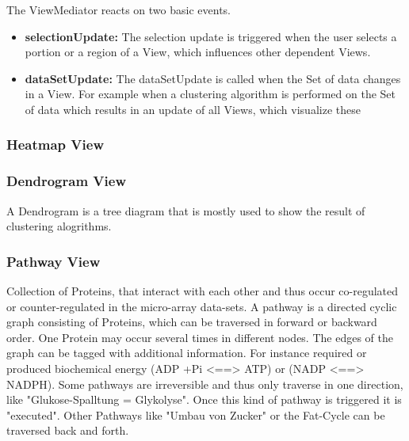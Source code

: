 The ViewMediator reacts on two basic events.
\begin{itemize}
\item \textbf{selectionUpdate: } The selection update is triggered when the user selects a portion or a region of a View, which influences other dependent Views.
\item \textbf{dataSetUpdate: } The dataSetUpdate is called when the Set of data changes in a View. For example when a clustering algorithm is performed on the Set of data which results in an update of all Views, which visualize these 
\end{itemize}

\subsubsection{Heatmap View}

\subsubsection{Dendrogram View}

A Dendrogram is a tree diagram that is mostly used to show the result of clustering alogrithms.

\subsubsection{Pathway View}

\label{msec:pathway_description}

Collection of Proteins, that interact with each other and thus occur co-regulated or counter-regulated in the micro-array data-sets. A pathway is a directed cyclic graph consisting of Proteins, which can be traversed in forward or backward order. One Protein may occur several times in different nodes. The edges of the graph can be tagged with additional information. For instance required or produced biochemical energy (ADP +Pi  <==> ATP) or (NADP <==> NADPH). Some pathways are irreversible and thus only traverse in one direction, like "Glukose-Spalltung = Glykolyse". Once this kind of pathway is triggered it is "executed". Other Pathways like "Umbau von Zucker" or the Fat-Cycle can be traversed back and forth.

